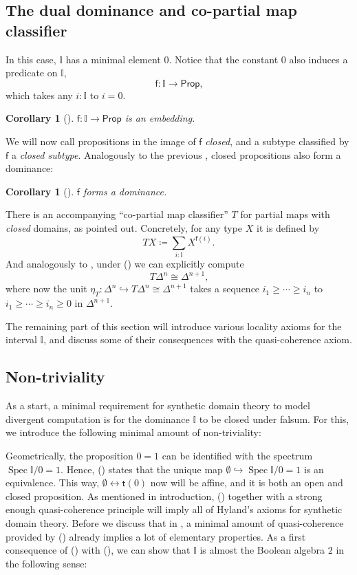 \documentclass[a4paper,12pt]{amsart}
\newtheorem{corollary}[theorem]{Corollary}
\theoremstyle{definition}
\newcommand{\mbb}[1]{\mathbb{#1}}
\newcommand{\I}{\mbb I}
\newcommand{\ms}[1]{\mathsf{#1}}
\newcommand{\hook}{\hookrightarrow}
\newcommand{\emp}{\emptyset}
\newcommand{\eq}{\leftrightarrow}
\newcommand{\pp}{\ms{Prop}}
\newcommand{\spec}{\operatorname{Spec}}
\newcommand\istsym{\ms{t}}
\newcommand\isfsym{\ms{f}}
\newcommand\ist[1]{\istsym(#1)}
\newcommand\isf[1]{\isfsym(#1)}
\begin{document}
\subsection{The dual dominance and co-partial map classifier}
In this case, $\I$ has a minimal element $0$. Notice that the constant $0$ also induces a predicate on $\I$,
\[ \isfsym\colon \I \to \pp\text{,} \]
which takes any $i : \I$ to $i = 0$. 

\begin{corollary}[\AxiomSQCI]
  $\isfsym\colon \I \to \pp$ is an embedding.
\end{corollary}

We will now call propositions in the image of $\isfsym$ \emph{closed}, and a subtype classified by $\isfsym$ a \emph{closed subtype}. Analogously to the previous , closed propositions also form a dominance:

\begin{corollary}[\AxiomSQCI]\label{cor:dualisdominance}
  $\isfsym$ forms a dominance.
\end{corollary}

There is an accompanying ``co-partial map classifier'' $T$ for partial maps with \emph{closed} domains, as \citet{hyland1990first} pointed out. Concretely, for any type $X$ it is defined by
\[ T X \coloneq \sum_{i:\I} X^{\isf{i}}\text{.} \]
And analogously to , under (\AxiomSQCI) we can explicitly compute 
\[ T\Delta^n \cong \Delta^{n+1}\text{,} \]
where now the unit $\eta_T \colon \Delta^n \hook T\Delta^n \cong \Delta^{n+1}$ takes a sequence $i_1 \ge \cdots \ge i_n$ to $i_1 \ge \cdots \ge i_n \ge 0$ in $\Delta^{n+1}$. 

The remaining part of this section will introduce various locality axioms for the interval $\I$, and discuss some of their consequences with the quasi-coherence axiom.

\subsection{Non-triviality}

As a start, a minimal requirement for synthetic domain theory to model divergent computation is for the dominance $\I$ to be closed under falsum. For this, we introduce the following minimal amount of non-triviality:

\PrintAxiomNT

Geometrically, the proposition $0 = 1$ can be identified with the spectrum $\spec\I/0=1$. Hence, (\AxiomNT) states that the unique map $\emp \hook \spec\I/0=1$ is an equivalence.
This way, $\emp \eq \ist{0}$ now will be affine, and it is both an open and closed proposition. As mentioned in introduction, (\AxiomNT) together with a strong enough quasi-coherence principle will imply all of Hyland's axioms for synthetic domain theory. Before we discuss that in , a minimal amount of quasi-coherence provided by (\AxiomSQCI) already implies a lot of elementary properties. As a first consequence of (\AxiomNT) with (\AxiomSQCI), we can show that $\I$ is almost the Boolean algebra $2$ in the following sense:
\end{document}
